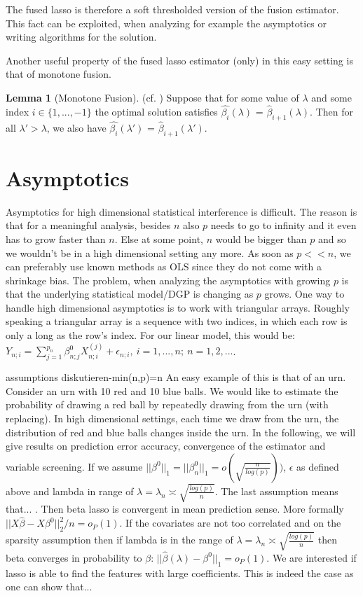 \documentclass{article}
\theoremstyle{definition}
\newtheorem{lemma}[theorem]{Lemma}
\begin{document}
The fused lasso is therefore a soft thresholded version of the fusion estimator. This fact can be exploited, when analyzing for example the asymptotics or writing algorithms for the solution.
\bigskip
	
Another useful property of the fused lasso estimator (only) in this easy setting is that of monotone fusion.

\begin{lemma}[Monotone Fusion] (cf. \citep{sparsity}) \label{monotone_fusion}
	Suppose that for some value of $\lambda$ and some index $i \in \{1, ..., -1 \}$ the optimal solution satisfies $\hat{\beta_i}(\lambda)$ = $\hat{\beta}_{i+1}(\lambda)$. Then for all $\lambda' > \lambda$, we also have $\hat{\beta_i}(\lambda')$ = $\hat{\beta}_{i+1}(\lambda')$.
\end{lemma}

\section{Asymptotics}

\label{sec:asymptoticslasso}

Asymptotics for high dimensional statistical interference is difficult. The reason is that for a meaningful analysis, besides $n$ also $p$ needs to go to infinity and it even has to grow faster than $n$. Else at some point, $n$ would be bigger than $p$ and so we wouldn't be in a high dimensional setting any more. As soon as $p << n$, we can preferably use known methods as OLS since they do not come with a shrinkage bias.  
The problem, when analyzing the asymptotics with growing $p$ is that the underlying statistical model/DGP is changing as $p$ grows. 
One way to handle high dimensional asymptotics is to work with triangular arrays. Roughly speaking a triangular array is a sequence with two indices, in which each row is only a long as the row's index.  For our linear model, this would be: $Y_{n;i}=\sum^{p_n}_{j=1}\beta^0_{n;j}X^{(j)}_{n;i}+\epsilon_{n;i}, \ i=1,...,n; \ n=1,2,...$. 
\bigskip

assumptions diskutieren-min(n,p)=n
An easy example of this is that of an urn. Consider an urn with 10 red and 10 blue balls. We would like to estimate the probability of drawing a red ball by repeatedly drawing from the urn (with replacing). In high dimensional settings, each time we draw from the urn, the distribution of red and blue balls changes inside the urn. In the following, we will give results on prediction error accuracy, convergence of the estimator and variable screening. 
If we assume $||\beta^0||_1=||\beta_n^0||_1=o(\sqrt{\frac{n}{log(p)}}))$, $\epsilon$ as defined above and lambda in range of $\lambda=\lambda_n\asymp\sqrt{\frac{log(p)}{n}}$. The last assumption means that... . Then beta lasso is convergent in mean prediction sense. More formally $||X\hat{\beta}-X\beta^0||_2^2/n=o_P(1)$.
If the covariates are not too correlated and on the sparsity assumption then if lambda is in the range of $\lambda=\lambda_n\asymp\sqrt{\frac{log(p)}{n}}$ then beta converges in probability to $\beta$: $||\hat{\beta}(\lambda)-\beta^0||_1=o_P(1)$. 
We are interested if lasso is able to find the features with large coefficients. This is indeed the case as one can show that...
\end{document}
